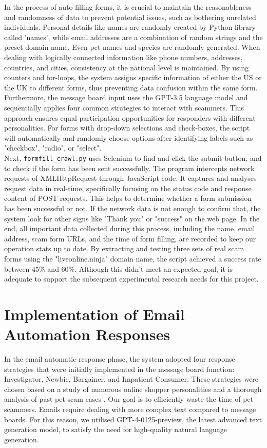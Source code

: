 \documentclass[ oneside,%
                    author={Cassie Qing Tang},
                    degree={BSc},
                     title={An Automated Response System for Disrupting Online Pet Scamming \\ },
                    subtitle={ }]{dissertation}
\begin{document}
In the process of auto-filling forms, it is crucial to maintain the reasonableness and randomness of data to prevent potential issues, such as bothering unrelated individuals. Personal details like names are randomly created by Python library called 'names', while email addresses are a combination of random strings and the preset domain name. Even pet names and species are randomly generated. When dealing with logically connected information like phone numbers, addresses, countries, and cities, consistency at the national level is maintained. By using counters and for-loops, the system assigns specific information of either the US or the UK to different forms, thus preventing data confusion within the same form. Furthermore, the message board input uses the GPT-3.5 language model and sequentially applies four common strategies to interact with scammers. This approach ensures equal participation opportunities for responders with different personalities. For forms with drop-down selections and check-boxes, the script will automatically and randomly choose options after identifying labels such as "checkbox", "radio", or "select".
\\

Next, \texttt{formfill\_crawl.py} uses Selenium to find and click the submit button, and to check if the form has been sent successfully. The program intercepts network requests of XMLHttpRequest through JavaScript code. It captures and analyses request data in real-time, specifically focusing on the status code and response content of POST requests. This helps to determine whether a form submission has been successful or not. If the network data is not enough to confirm that, the system look for other signs like "Thank you" or "success" on the web page. In the end, all important data collected during this process, including the name, email address, scam form URLs, and the time of form filling, are recorded to keep our operation stats up to date. By extracting and testing three sets of real scam forms using the "liveonline.ninja" domain name, the script achieved a success rate between 45\% and 60\%. Although this didn't meet an expected goal, it is adequate to support the subsequent experimental research needs for this project.


\section{Implementation of Email Automation Responses}
In the email automatic response phase, the system adopted four response strategies that were initially implemented in the message board function: Investigator, Newbie, Bargainer, and Impatient Consumer. These strategies were chosen based on a study of numerous online shopper personalities \cite{noauthor_types_nodate} and a thorough analysis of past pet scam cases \cite{whittaker_understanding_2020}. Our goal is to efficiently waste the time of pet scammers. Emails require dealing with more complex text compared to message boards. For this reason, we utilised GPT-4-0125-preview, the latest advanced text generation model, to satisfy the need for high-quality natural language generation.
\\
\end{document}
